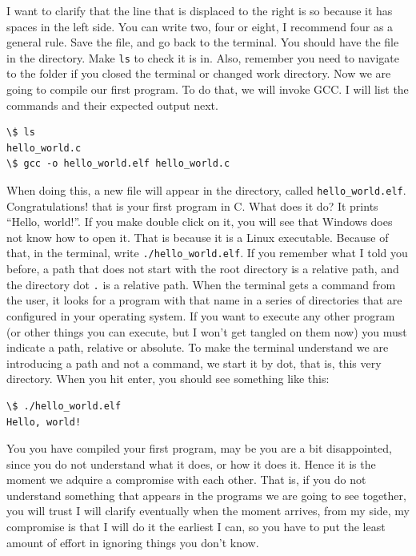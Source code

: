 \documentclass[a4paper]{article}
\begin{document}
I want to clarify that the line that is displaced to the right is so because it
has spaces in the left side. You can write two, four or eight, I recommend four
as a general rule. Save the file, and go back to the terminal. You should have
the file in the directory. Make \verb!ls! to check it is in. Also, remember you
need to navigate to the folder if you closed the terminal or changed work
directory. Now we are going to compile our first program. To do that, we will
invoke GCC. I will list the commands and their expected output next.

\noindent
\begin{minipage}[H]{\linewidth}
\mbox{}
\begin{lstlisting}[style=terminalStyle]
\$ ls
hello_world.c
\$ gcc -o hello_world.elf hello_world.c
\end{lstlisting}
\end{minipage}

When doing this, a new file will appear in the directory, called
\verb!hello_world.elf!. Congratulations! that is your first program in C. What
does it do? It prints ``Hello, world!''. If you make double click on it, you
will see that Windows does not know how to open it. That is because it is a
Linux executable. Because of that, in the terminal, write
\verb!./hello_world.elf!. If you remember what I told you before, a path that
does not start with the root directory is a relative path, and the directory
dot \verb!.! is a relative path. When the terminal gets a command from the user,
it looks for a program with that name in a series of directories that are
configured in your operating system. If you want to execute any other program
(or other things you can execute, but I won't get tangled on them now) you must
indicate a path, relative or absolute. To make the terminal understand we are
introducing a path and not a command, we start it by dot, that is, this very
directory. When you hit enter, you should see something like this:

\noindent
\begin{minipage}[H]{\linewidth}
\mbox{}
\begin{lstlisting}[style=terminalStyle]
\$ ./hello_world.elf
Hello, world!
\end{lstlisting}
\end{minipage}

You you have compiled your first program, may be you are a bit disappointed,
since you do not understand what it does, or how it does it. Hence it is the
moment we adquire a compromise with each other. That is, if you do not
understand something that appears in the programs we are going to see together,
you will trust I will clarify eventually when the moment arrives, from my side,
my compromise is that I will do it the earliest I can, so you have to put the
least amount of effort in ignoring things you don't know.
\end{document}
